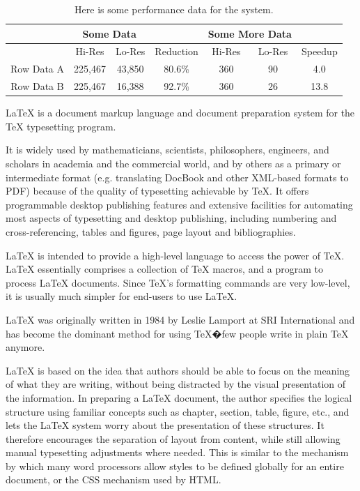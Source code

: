 \documentclass[12pt]{ucthesis}
\newcommand{\captionfonts}{\small\bf\ssp}
\begin{document}


\begin{table}
\begin{center}

\begin{tabular}{|c|c|c|c|c|c|c|}
\hline 
&
\multicolumn{2}{c|}{Some Data}&
&
\multicolumn{2}{c|}{Some More Data}&
\tabularnewline
\hline
\hline 
&  Hi-Res&  Lo-Res&  Reduction&  Hi-Res&  Lo-Res&  Speedup
\tabularnewline
\hline 
Row Data A &  225,467&  43,850&  80.6\%&  360&  90&  4.0
\tabularnewline
\hline 
Row Data B &  225,467&  16,388&  92.7\%&  360&  26&  13.8
\tabularnewline
\hline 
\end{tabular}


\captionfonts
\caption[Performance data]{Here is some performance data for the system.}
\label{table:performance}
\end{center}
\end{table}


LaTeX is a document markup language and document preparation system for the TeX typesetting program.

It is widely used by mathematicians, scientists, philosophers, engineers, and scholars in academia and the commercial world, and by others as a primary or intermediate format (e.g. translating DocBook and other XML-based formats to PDF) because of the quality of typesetting achievable by TeX. It offers programmable desktop publishing features and extensive facilities for automating most aspects of typesetting and desktop publishing, including numbering and cross-referencing, tables and figures, page layout and bibliographies.

LaTeX is intended to provide a high-level language to access the power of TeX. LaTeX essentially comprises a collection of TeX macros, and a program to process LaTeX documents. Since TeX's formatting commands are very low-level, it is usually much simpler for end-users to use LaTeX.

LaTeX was originally written in 1984 by Leslie Lamport at SRI International and has become the dominant method for using TeX�few people write in plain TeX anymore.

LaTeX is based on the idea that authors should be able to focus on the meaning of what they are writing, without being distracted by the visual presentation of the information. In preparing a LaTeX document, the author specifies the logical structure using familiar concepts such as chapter, section, table, figure, etc., and lets the LaTeX system worry about the presentation of these structures. It therefore encourages the separation of layout from content, while still allowing manual typesetting adjustments where needed. This is similar to the mechanism by which many word processors allow styles to be defined globally for an entire document, or the CSS mechanism used by HTML.
\end{document}
